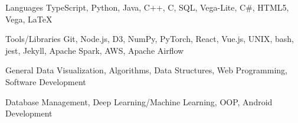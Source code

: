 

\begin{cvskills}

  \cvskill
    {Languages} %
    {TypeScript, Python, Java, C++, C, SQL, Vega-Lite, C\#, HTML5, Vega, LaTeX} %

  \cvskill
    {Tools/Libraries} %
    {Git, Node.js, D3, NumPy, PyTorch, React, Vue.js, UNIX, bash, jest, Jekyll, Apache Spark, AWS, Apache Airflow} %

  \cvskill
    {General} %
    {Data Visualization, Algorithms, Data Structures, Web Programming, Software Development} %

  \cvskill
    {} %
    {Database Management, Deep Learning/Machine Learning, OOP, Android Development} %

\end{cvskills}